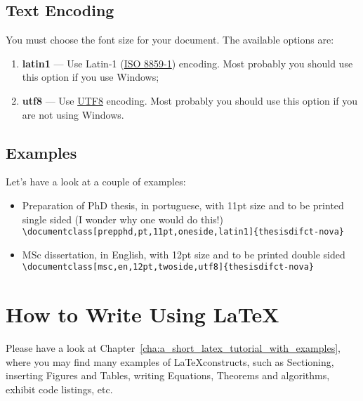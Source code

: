 \subsection{Text Encoding}
\label{ssec:text_encoding}

You must choose the font size for your document. The available options are:
\begin{enumerate}
  \item \textbf{latin1} --- Use Latin-1 (\href{http://en.wikipedia.org/wiki/ISO/IEC_8859-1}{ISO 8859-1}) encoding.  Most probably you should use this option if you use Windows;
  \item \textbf{utf8} --- Use \href{http://en.wikipedia.org/wiki/UTF-8}{UTF8} encoding.    Most probably you should use this option if you are not using Windows.
\end{enumerate}

\subsection{Examples}
\label{ssec:examples}

Let's have a look at a couple of examples:

\begin{itemize}
  \item Preparation of PhD thesis, in portuguese, with 11pt size and to be printed single sided (I wonder why one would do this!)\\
  \verb!\documentclass[prepphd,pt,11pt,oneside,latin1]{thesisdifct-nova}!
  \item MSc dissertation, in English, with 12pt size and to be printed double sided\\
  \verb!\documentclass[msc,en,12pt,twoside,utf8]{thesisdifct-nova}!
\end{itemize}

\section{How to Write Using \LaTeX}
\label{sec:how_to_write_using_latex}

Please have a look at Chapter~\ref{cha:a_short_latex_tutorial_with_examples}, where you may find many examples of \LaTeX constructs, such as Sectioning, inserting Figures and Tables, writing Equations, Theorems and algorithms, exhibit code listings, etc.

